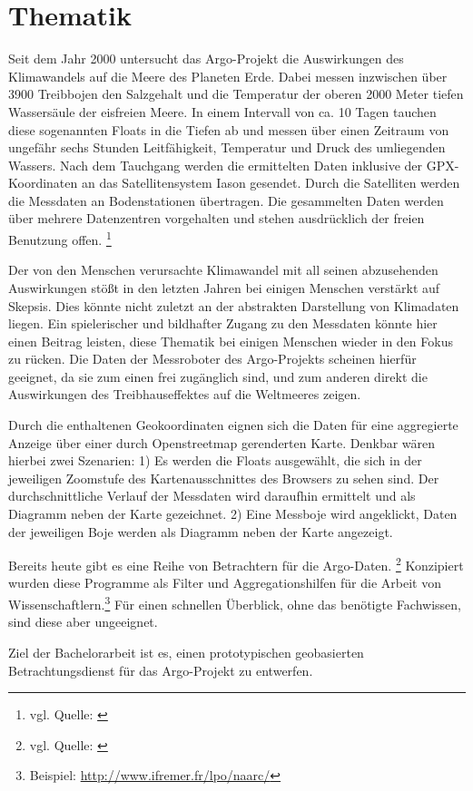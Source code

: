 \section{Thematik}


Seit dem Jahr 2000 untersucht das Argo-Projekt die Auswirkungen des Klimawandels auf die Meere des Planeten Erde.
Dabei messen inzwischen über 3900 Treibbojen den Salzgehalt und die Temperatur der oberen 2000 Meter tiefen Wassersäule der eisfreien Meere. In einem  Intervall von ca. 10 Tagen tauchen diese sogenannten Floats in die Tiefen ab und messen über einen Zeitraum von ungefähr sechs Stunden Leitfähigkeit, Temperatur und Druck des umliegenden Wassers. Nach dem Tauchgang werden die  ermittelten Daten inklusive der GPX-Koordinaten an das Satellitensystem Iason gesendet. Durch die Satelliten werden die Messdaten an Bodenstationen übertragen. Die gesammelten Daten  werden über mehrere Datenzentren vorgehalten und stehen ausdrücklich der freien Benutzung offen. \footnote{ vgl. Quelle: \cite{ArgoDataBeginnersGuide}}

Der von den Menschen verursachte Klimawandel mit all seinen abzusehenden Auswirkungen 
stößt in den letzten Jahren bei einigen Menschen verstärkt auf Skepsis. 
Dies könnte nicht zuletzt an der abstrakten Darstellung von Klimadaten liegen. Ein spielerischer und bildhafter Zugang zu den Messdaten könnte hier einen Beitrag leisten, 
diese Thematik bei einigen Menschen wieder in den Fokus zu rücken.
Die Daten der Messroboter des Argo-Projekts scheinen hierfür geeignet, da sie zum einen frei zugänglich sind, und zum anderen direkt die Auswirkungen des Treibhauseffektes auf die Weltmeeres zeigen. 

Durch die enthaltenen Geokoordinaten eignen sich die Daten für eine aggregierte Anzeige über einer durch Openstreetmap gerenderten Karte. Denkbar wären hierbei zwei Szenarien: 1) Es werden die Floats ausgewählt, die sich in der jeweiligen Zoomstufe des Kartenausschnittes des Browsers zu sehen sind. Der durchschnittliche Verlauf der Messdaten wird daraufhin ermittelt und als Diagramm neben der Karte gezeichnet.
2) Eine Messboje wird angeklickt, Daten der jeweiligen Boje werden als Diagramm neben der Karte angezeigt. 

Bereits heute gibt es eine Reihe von Betrachtern für die Argo-Daten. \footnote{ vgl. Quelle: \cite{ArgoDataViewers}}  
Konzipiert wurden diese Programme als Filter und Aggregationshilfen für die Arbeit von Wissenschaftlern.\footnote{Beispiel: \url{http://www.ifremer.fr/lpo/naarc/}} Für einen schnellen Überblick, ohne das benötigte Fachwissen, sind diese aber ungeeignet.

Ziel der Bachelorarbeit ist es, einen prototypischen geobasierten Betrachtungsdienst für das Argo-Projekt zu entwerfen.
